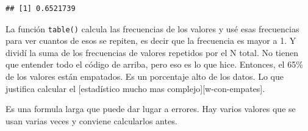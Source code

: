 \documentclass[]{book}
\newenvironment{Shaded}{\begin{snugshade}}{\end{snugshade}}
\newcommand{\DataTypeTok}[1]{\textcolor[rgb]{0.13,0.29,0.53}{#1}}
\newcommand{\DecValTok}[1]{\textcolor[rgb]{0.00,0.00,0.81}{#1}}
\newcommand{\KeywordTok}[1]{\textcolor[rgb]{0.13,0.29,0.53}{\textbf{#1}}}
\newcommand{\NormalTok}[1]{#1}
\newcommand{\OperatorTok}[1]{\textcolor[rgb]{0.81,0.36,0.00}{\textbf{#1}}}
\newcommand{\StringTok}[1]{\textcolor[rgb]{0.31,0.60,0.02}{#1}}
\theoremstyle{definition}
\theoremstyle{definition}
\theoremstyle{definition}
\theoremstyle{remark}
\begin{document}
\begin{verbatim}
## [1] 0.6521739
\end{verbatim}

La función \texttt{table()} calcula las frecuencias de los valores y usé
esas frecuencias para ver cuantos de esos se repiten, es decir que la
frecuencia es mayor a 1. Y dividí la suma de los frecuencias de valores
repetidos por el N total. No tienen que entender todo el código de
arriba, pero eso es lo que hice. Entonces, el 65\% de los valores están
empatados. Es un porcentaje alto de los datos. Lo que justifica calcular
el {[}estadístico mucho mas complejo{]}{[}w-con-empates{]}.

Es una formula larga que puede dar lugar a errores. Hay varios valores
que se usan varias veces y conviene calcularlos antes.

\begin{Shaded}
\end{Shaded}
\end{document}
